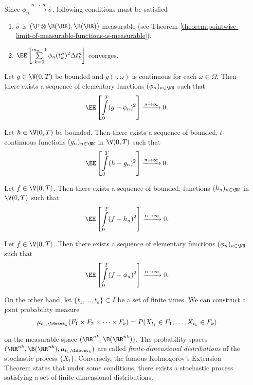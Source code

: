 Since $\phi_n\xrightarrow{n\to\infty}\hat{\sigma}$, following conditions must be satisfied

\begin{enumerate}[label=(\roman*), ref=(\roman*)]
  \item $\hat{\sigma}$ is $(\F\otimes\B(\RR), \B(\RR))$-measurable (see Theorem \ref{theorem:pointwise-limit-of-measurable-functions-is-measurable}).
  \item $\EE\left[\sum\limits_{k=0}^{m_n-1} \phi_n(t_{k}^n)^2 \Delta t_k^n\right]$ converges.
\end{enumerate}

\begin{lemma}
  Let $g\in \V(0,T)$ be bounded and $g(\cdot, \omega)$ is continuous for each $\omega\in\Omega$. Then there exists a sequence of elementary functions $(\phi_n)_{n\in\NN}$ such that
  $$\EE\left[\int\limits_0^T(g-\phi_n)^2\right]\xrightarrow{n\to\infty}0.$$
\end{lemma}

\begin{lemma}
  Let $h\in \V(0,T)$ be bounded. Then there exists a sequence of bounded, $t$-continuous functions $(g_n)_{n\in\NN}$ in $\V(0,T)$ such that
  $$\EE\left[\int\limits_0^T(h-g_n)^2\right]\xrightarrow{n\to\infty}0.$$
\end{lemma}

\begin{lemma}
  Let $f\in \V(0,T)$. Then there exists a sequence of bounded, functions $(h_n)_{n\in\NN}$ in $\V(0,T)$ such that
  $$\EE\left[\int\limits_0^T(f-h_n)^2\right]\xrightarrow{n\to\infty}0.$$
\end{lemma}

\begin{theorem}
  Let $f\in \V(0,T)$. Then there exists a sequence of elementary functions $(\phi_n)_{n\in\NN}$ such that
  $$\EE\left[\int\limits_0^T(f-\phi_n)^2\right]\xrightarrow{n\to\infty}0.$$
\end{theorem}

On the other hand, let $\{t_1,\ldots,t_k\}\subset I$ be a set of finite times. We can construct a joint probability measure
$$\mu_{t_1,\ldotst_k}(F_1\times F_2\times\cdots\times F_k)=P(X_{t_1}\in F_1,\ldots,X_{t_k}\in F_k)$$

on the measurable space $(\RR^{nk},\B(\RR^{nk}))$. The probability spaces $(\RR^{nk},\B(\RR^{nk}),\mu_{t_1,\ldotst_k})$ are called \textit{finite-dimensional distributions} of the stochastic process $\{X_t\}$. Conversely, the famous Kolmogorov's Extension Theorem \cite{oksendal2013stochastic} states that under some conditions, there exists a stochastic process satisfying a set of finite-dimensional distributions.

